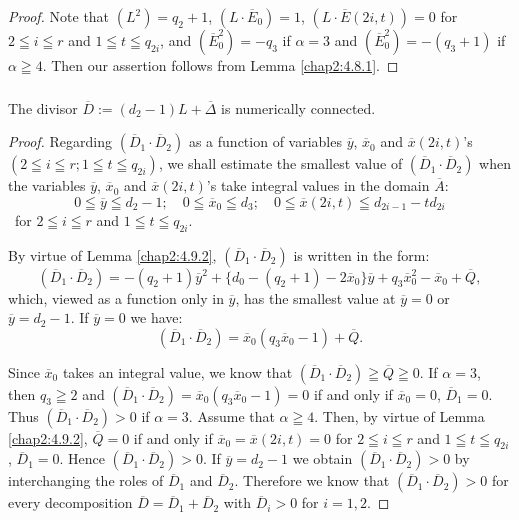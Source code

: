 \begin{proof}
Note that $(L^{2})=q_{2}+1$, $(L\cdot\overline{E}_{0})=1$, $(L\cdot
\overline{E}(2i,t))=0$ for $2\leqq i\leqq r$ and $1\leqq t\leqq
q_{2i}$, and $(\overline{E}^{2}_{0})=-q_{3}$ if $\alpha=3$ and
$(\overline{E}^{2}_{0})=-(q_{3}+1)$ if $\alpha\geqq 4$. Then our
assertion follows from Lemma \ref{chap2:4.8.1}.
\end{proof}

\subsubsection{}\label{chap2:4.9.3}
\begin{lemma*}
  The divisor $\overline{D}:=(d_{2}-1)L+\overline{\Delta}$ is
  numerically connected.
\end{lemma*}

\begin{proof}
Regarding $(\overline{D}_{1}\cdot \overline{D}_{2})$ as a function of
variables $\overline{y}$, $\overline{x}_{0}$ and
$\overline{x}(2i,t)$'s $(2\leqq i\leqq r;1\leqq t\leqq q_{2i})$, we
shall estimate the smallest value of $(\overline{D}_{1}\cdot
\overline{D}_{2})$ when the variables $\overline{y}$,
$\overline{x}_{0}$ and $\overline{x}(2i,t)$'s take integral values in
the domain $\overline{A}$:
$$
0\leqq \overline{y}\leqq d_{2}-1;\quad 0\leqq \overline{x}_{0}\leqq
d_{3};\quad 0\leqq \overline{x}(2i,t)\leqq d_{2i-1}-td_{2i}
$$\pageoriginale\
for $2\leqq i\leqq r$ and $1\leqq t\leqq q_{2i}$.

By virtue of Lemma \ref{chap2:4.9.2}, $(\overline{D}_{1}\cdot
\overline{D}_{2})$ is written in the form:
$$
(\overline{D}_{1}\cdot
\overline{D}_{2})=-(q_{2}+1)\overline{y}^{2}+\{d_{0}-(q_{2}+1)-2\overline{x}_{0}\}\overline{y}+q_{3}\overline{x}^{2}_{0}-\overline{x}_{0}+\overline{Q}, 
$$
which, viewed as a function only in $\overline{y}$, has the smallest
value at $\overline{y}=0$ or $\overline{y}=d_{2}-1$. If
$\overline{y}=0$ we have:
$$
(\overline{D}_{1}\cdot
\overline{D}_{2})=\overline{x}_{0}(q_{3}\overline{x}_{0}-1)+\overline{Q}. 
$$

Since $\overline{x}_{0}$ takes an integral value, we know that
$(\overline{D}_{1}\cdot\overline{D}_{2})\geqq \overline{Q}\geqq 0$. If
$\alpha=3$, then $q_{3}\geqq 2$ and $(\overline{D}_{1}\cdot
\overline{D}_{2})=\overline{x}_{0}(q_{3}\overline{x}_{0}-1)=0$ if and
only if $\overline{x}_{0}=0$, \iec $\overline{D}_{1}=0$. Thus
$(\overline{D}_{1}\cdot \overline{D}_{2})>0$ if $\alpha=3$. Assume
that $\alpha\geqq 4$. Then, by virtue of Lemma \ref{chap2:4.9.2},
$\overline{Q}=0$ if and only if
$\overline{x}_{0}=\overline{x}(2i,t)=0$ for $2\leqq i\leqq r$ and
$1\leqq t\leqq q_{2i}$, \iec $\overline{D}_{1}=0$. Hence
$(\overline{D}_{1}\cdot \overline{D}_{2})>0$. If
$\overline{y}=d_{2}-1$ we obtain $(\overline{D}_{1}\cdot
\overline{D}_{2})>0$ by interchanging the roles of $\overline{D}_{1}$
and $\overline{D}_{2}$. Therefore we know that $(\overline{D}_{1}\cdot
\overline{D}_{2})>0$ for every decomposition
$\overline{D}=\overline{D}_{1}+\overline{D}_{2}$ with
$\overline{D}_{i}>0$ for $i=1,2$.
\end{proof}

